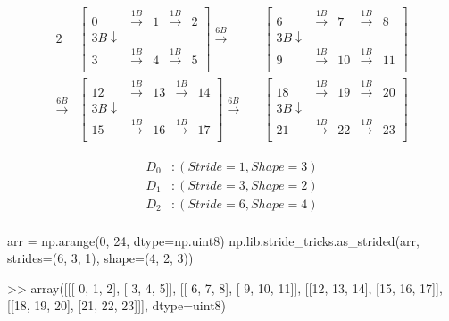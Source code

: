 \documentclass[oneside, 12pt]{report}
\begin{document}
\begin{figure}[H]
\begin{alignat*}{2}
&\begin{bmatrix}
0 & \xrightarrow{1B} & 1 &\xrightarrow{1B} & 2 \\
3B \downarrow \\
3 & \xrightarrow{1B} & 4 &\xrightarrow{1B} & 5 \\
\end{bmatrix}
\xrightarrow{6B} 
&&\begin{bmatrix}
6 & \xrightarrow{1B} & 7 &\xrightarrow{1B} & 8 \\
3B \downarrow \\
9 & \xrightarrow{1B} & 10 &\xrightarrow{1B} & 11 \\
\end{bmatrix}\\
\xrightarrow{6B} 
&\begin{bmatrix}
12 & \xrightarrow{1B} & 13 &\xrightarrow{1B} & 14 \\
3B \downarrow \\
15 & \xrightarrow{1B} & 16 &\xrightarrow{1B} & 17 \\
\end{bmatrix} 
\xrightarrow{6B} 
&&\begin{bmatrix}
18 & \xrightarrow{1B} & 19 &\xrightarrow{1B} & 20 \\
3B \downarrow \\
21 & \xrightarrow{1B} & 22 &\xrightarrow{1B} & 23 \\
\end{bmatrix}
\end{alignat*}
\end{figure}

\begin{align*}
D_0&:(Stride=1, Shape=3)\\
D_1&:(Stride=3, Shape=2)\\
D_2&:(Stride=6, Shape=4)\\
\end{align*}

\begin{python}
arr = np.arange(0, 24, dtype=np.uint8)
np.lib.stride_tricks.as_strided(arr, strides=(6, 3, 1), shape=(4, 2, 3))

>> array([[[ 0,  1,  2],
           [ 3,  4,  5]],
          [[ 6,  7,  8],
           [ 9, 10, 11]],
          [[12, 13, 14],
           [15, 16, 17]],
          [[18, 19, 20],
           [21, 22, 23]]], dtype=uint8)
\end{python}
\end{document}
